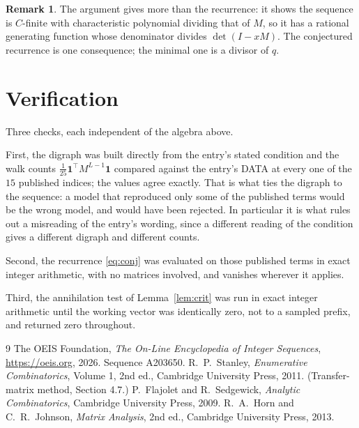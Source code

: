 \documentclass[11pt,a4paper]{article}
\theoremstyle{plain}
\theoremstyle{definition}
\newtheorem{remark}[theorem]{Remark}
\begin{document}
\begin{remark}
The argument gives more than the recurrence: it shows the sequence is $C$-finite with
characteristic polynomial dividing that of $M$, so it has a rational generating function
whose denominator divides $\det(I-xM)$. The conjectured recurrence is one consequence; the
minimal one is a divisor of $q$.
\end{remark}

\section{Verification}

Three checks, each independent of the algebra above.

First, the digraph was built directly from the entry's stated condition and the walk counts
$\tfrac1{25}\mathbf{1}^{\!\top}M^{L-1}\mathbf{1}$ compared against the entry's DATA at
every one of the $15$ published indices; the values agree exactly. That is what ties
the digraph to the sequence: a model that reproduced only some of the published terms would
be the wrong model, and would have been rejected. In particular it is what rules out a
misreading of the entry's wording, since a different reading of the condition gives a
different digraph and different counts.

Second, the recurrence \eqref{eq:conj} was evaluated on those published terms in exact
integer arithmetic, with no matrices involved, and vanishes wherever it applies.

Third, the annihilation test of Lemma~\ref{lem:crit} was run in exact integer arithmetic
until the working vector was identically zero, not to a sampled prefix, and returned zero
throughout.

\begin{thebibliography}{9}
 The OEIS Foundation, \emph{The On-Line Encyclopedia of Integer
Sequences}, \url{https://oeis.org}, 2026. Sequence A203650.
 R.~P.~Stanley, \emph{Enumerative Combinatorics}, Volume 1, 2nd ed.,
Cambridge University Press, 2011. (Transfer-matrix method, Section 4.7.)
 P.~Flajolet and R.~Sedgewick, \emph{Analytic Combinatorics}, Cambridge
University Press, 2009.
 R.~A.~Horn and C.~R.~Johnson, \emph{Matrix Analysis}, 2nd ed., Cambridge
University Press, 2013.
\end{thebibliography}
\end{document}
